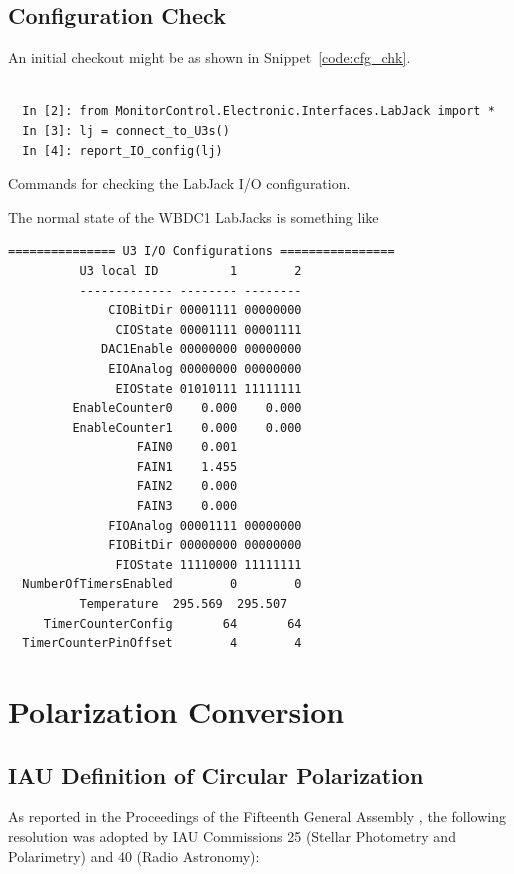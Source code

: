 \documentclass[letterpaper,11pt]{book}
\begin{document}
\section{Configuration Check}\label{sec:cfg_chk}

An initial checkout might be as shown in Snippet~\ref{code:cfg_chk}.
\begin{code}[h!tb]
\begin{center}
\begin{verbatim}

  In [2]: from MonitorControl.Electronic.Interfaces.LabJack import *
  In [3]: lj = connect_to_U3s()
  In [4]: report_IO_config(lj)\end{verbatim}
\caption{\label{code:cfg_chk}Commands for checking the LabJack I/O
configuration.}
\end{center}
\end{code}
The normal state of the WBDC1 LabJacks is something like
\begin{verbatim}
=============== U3 I/O Configurations ================
          U3 local ID          1        2
          ------------- -------- --------
              CIOBitDir 00001111 00000000
               CIOState 00001111 00001111
             DAC1Enable 00000000 00000000
              EIOAnalog 00000000 00000000
               EIOState 01010111 11111111
         EnableCounter0    0.000    0.000
         EnableCounter1    0.000    0.000
                  FAIN0    0.001
                  FAIN1    1.455
                  FAIN2    0.000
                  FAIN3    0.000
              FIOAnalog 00001111 00000000
              FIOBitDir 00000000 00000000
               FIOState 11110000 11111111
  NumberOfTimersEnabled        0        0
          Temperature  295.569  295.507
     TimerCounterConfig       64       64
  TimerCounterPinOffset        4        4
\end{verbatim}

\chapter{Polarization Conversion}\label{app:pol}

\section{IAU Definition of Circular Polarization}

As reported in the Proceedings of the Fifteenth General Assembly \cite{IAU1974},
the following resolution was adopted by IAU Commissions 25 (Stellar Photometry
and Polarimetry) and 40 (Radio Astronomy):
\end{document}

